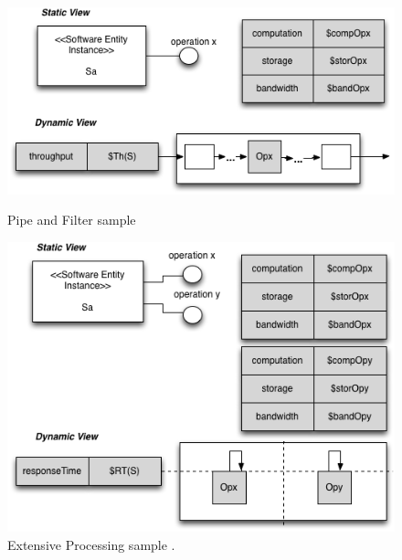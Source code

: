 \begin{figure}[h]
\begin{minipage}{.5\textwidth}
\centering
\includegraphics[width=1\textwidth]{./images/pipe2.png}
\caption{Pipe and Filter sample \cite{Vetoio2011}}
\label{fig:pipefilter}
\end{minipage}
\begin{minipage}{.5\textwidth}
\centering
\includegraphics[width=1\textwidth]{./images/extpro.png}
\caption{Extensive Processing sample \cite{Vetoio2011}.}
\label{fig:extpro}
\end{minipage}
\end{figure}


